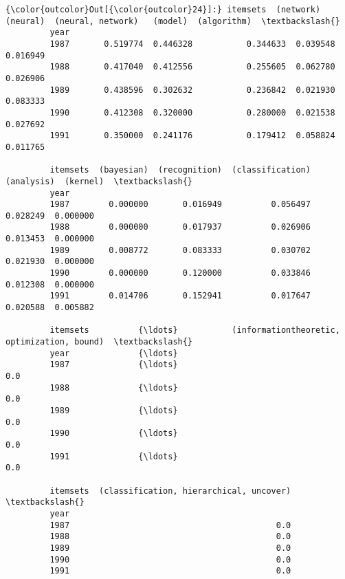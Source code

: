 \documentclass[11pt]{article}
\begin{document}
\begin{Verbatim}[commandchars=\\\{\}]
{\color{outcolor}Out[{\color{outcolor}24}]:} itemsets  (network)  (neural)  (neural, network)   (model)  (algorithm)  \textbackslash{}
         year                                                                      
         1987       0.519774  0.446328           0.344633  0.039548     0.016949   
         1988       0.417040  0.412556           0.255605  0.062780     0.026906   
         1989       0.438596  0.302632           0.236842  0.021930     0.083333   
         1990       0.412308  0.320000           0.280000  0.021538     0.027692   
         1991       0.350000  0.241176           0.179412  0.058824     0.011765   
         
         itemsets  (bayesian)  (recognition)  (classification)  (analysis)  (kernel)  \textbackslash{}
         year                                                                          
         1987        0.000000       0.016949          0.056497    0.028249  0.000000   
         1988        0.000000       0.017937          0.026906    0.013453  0.000000   
         1989        0.008772       0.083333          0.030702    0.021930  0.000000   
         1990        0.000000       0.120000          0.033846    0.012308  0.000000   
         1991        0.014706       0.152941          0.017647    0.020588  0.005882   
         
         itemsets          {\ldots}           (informationtheoretic, optimization, bound)  \textbackslash{}
         year              {\ldots}                                                         
         1987              {\ldots}                                                   0.0   
         1988              {\ldots}                                                   0.0   
         1989              {\ldots}                                                   0.0   
         1990              {\ldots}                                                   0.0   
         1991              {\ldots}                                                   0.0   
         
         itemsets  (classification, hierarchical, uncover)  \textbackslash{}
         year                                                
         1987                                          0.0   
         1988                                          0.0   
         1989                                          0.0   
         1990                                          0.0   
         1991                                          0.0   
         

\end{Verbatim}
\end{document}
